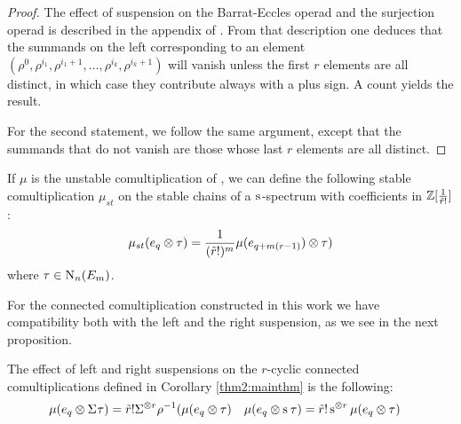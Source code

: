\begin{proof}
    The effect of suspension on the Barrat-Eccles operad and the surjection operad is described in the appendix of \cite{berger2004combinatorial}. From that description one deduces that the summands on the left corresponding to an element $(\rho^0,\rho^{i_1},\rho^{i_1+1},\ldots,\rho^{i_k},\rho^{i_k+1})$ will vanish unless the first $r$ elements are all distinct, in which case they contribute always with a plus sign. A count yields the result.

    For the second statement, we follow the same argument, except that the summands that do not vanish are those whose last $r$ elements are all distinct.
\end{proof}

\begin{corollary}
    If $\mu$ is the unstable comultiplication of \cite{medina2021may_st}, we can define the following stable comultiplication $\mu_{st}$ on the stable chains of a $\sus{}$-spectrum with coefficients in $\bZ[\frac{1}{\tilde{r}!}]$:
    \[
        \mu_{st}(e_q \ot  \tau) = \frac{1}{(\tilde{r}!)^{m}}\mu(e_{q+m(r-1)}) \ot  \tau)
    \]
    where $\tau\in \chains[n](E_m)$.
\end{corollary}

For the connected comultiplication constructed in this work we have compatibility both with the left and the right suspension, as we see in the next proposition.

\begin{proposition}\label{prop:suspensionconnected}
    The effect of left and right suspensions on the $r$-cyclic connected comultiplications defined in Corollary \ref{thm2:mainthm} is the following:
    \begin{align*}
       \mu(e_q \ot  \susp{}\tau) &= \tilde{r}!\susp{ \ot  r}\rho^{-1}(\mu(e_q \ot  \tau) &
       \mu(e_q \ot  \sus{}\tau) &= \tilde{r}!\sus{ \ot  r}\mu(e_q \ot  \tau)
    \end{align*}
\end{proposition}

